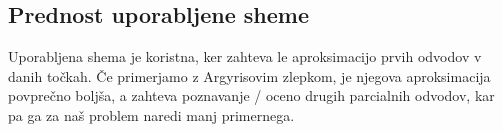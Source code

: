 \documentclass[ignorenonframetext]{beamer}
\let\frametitle\subsection %
\begin{document}
\begin{frame}
\frametitle{Prednost uporabljene sheme}
Uporabljena shema je koristna, ker zahteva le aproksimacijo prvih odvodov v danih točkah.
Če primerjamo z Argyrisovim zlepkom, je njegova aproksimacija povprečno boljša,
a zahteva poznavanje / oceno drugih parcialnih odvodov, kar pa ga za naš problem 
naredi manj primernega.
\end{frame}
\end{document}
